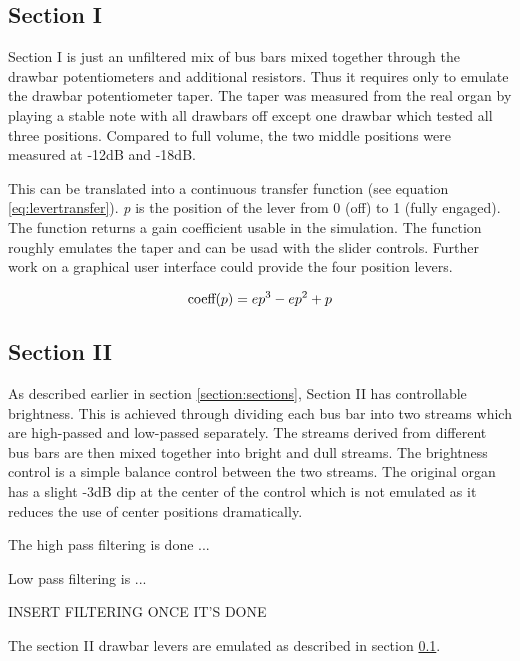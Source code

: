 \documentclass[11pt,a4paper]{article}
\begin{document}

\subsection{Section I}
\label{section:section-I}
Section I is just an unfiltered mix of bus bars mixed together through the drawbar potentiometers and additional resistors. Thus it requires only to emulate the drawbar potentiometer taper. The taper was measured from the real organ by playing a stable note with all drawbars off except one drawbar which tested all three positions. Compared to full volume, the two middle positions were measured at -12dB and -18dB.

This can be translated into a continuous transfer function (see equation \ref{eq:levertransfer}). \emph{p} is the position of the lever from 0 (off) to 1 (fully engaged). The function returns a gain coefficient usable in the simulation. The function roughly emulates the taper and can be usad with the slider controls. Further work on a graphical user interface could provide the four position levers.

\begin{equation}
\label{eq:levertransfer}
\mbox{coeff}(p) = e p^3 - e p^2 + p\\
\end{equation}



\subsection{Section II}

As described earlier in section \ref{section:sections}, Section II has controllable brightness. This is achieved through dividing each bus bar into two streams which are high-passed and low-passed separately. The streams derived from different bus bars are then mixed together into bright and dull streams. The brightness control is a simple balance control between the two streams. The original organ has a slight -3dB dip at the center of the control which is not emulated as it reduces the use of center positions dramatically.

The high pass filtering is done ...

Low pass filtering is ...

INSERT FILTERING ONCE IT'S DONE

The section II drawbar levers are emulated as described in section \ref{section:section-I}.
\end{document}
